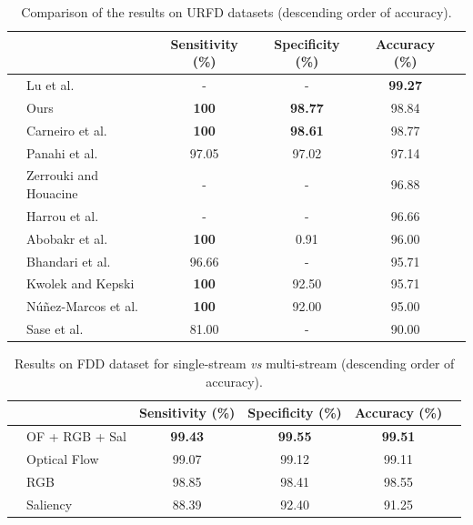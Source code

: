 \documentclass[conference]{IEEEtran}
\begin{document}
\begin{table}[]
\centering
\caption{Comparison of the results on URFD datasets (descending order of accuracy).}
\label{tab:urfd-our-their}
\begin{tabular}{llcccl}
\hline
 &                                                      & Sensitivity (\%)  & Specificity (\%)  & Accuracy (\%)     & \\ \hline
 & Lu et al.~\cite{lu2018deep}                          & -                 & -                 & \textbf{99.27}    & \\
 & Ours                                                 & \textbf{100}      & \textbf{98.77}    & 98.84             & \\
 & Carneiro et al.~\cite{carneiro2019multi}                                                 & \textbf{100}      & \textbf{98.61}    & 98.77             & \\
 & Panahi et al.~\cite{panahi2018human}                 & 97.05             & 97.02             & 97.14             & \\
 & Zerrouki and Houacine~\cite{zerrouki2018combined}    & -                 & -                 & 96.88             & \\
 & Harrou et al.~\cite{harrou2017vision}                & -                 & -                 & 96.66             & \\
 & Abobakr et al.~\cite{abobakr2017skeleton}            & \textbf{100}      & 0.91              & 96.00             & \\
 & Bhandari et al.~\cite{bhandari2017novel}             & 96.66             & -                 & 95.71             & \\
 & Kwolek and Kepski~\cite{kwolek2015improving}         & \textbf{100}      & 92.50             & 95.71             & \\
 & N\'u\~nez-Marcos et al.~\cite{nunez2017vision}       & \textbf{100}      & 92.00             & 95.00             & \\
 & Sase et al.~\cite{sase2018human}                     & 81.00             & -                 & 90.00             & \\ \hline
\end{tabular}
\end{table}
\begin{table}[]
\centering
\caption{Results on FDD dataset for single-stream \textit{vs} multi-stream (descending order of accuracy).}
\label{tab:fdd-ensem}
\begin{tabular}{llcccl}
\hline
 &  & Sensitivity (\%) & Specificity (\%) & Accuracy (\%) &  \\ \hline
 & OF + RGB + Sal & \textbf{99.43} & \textbf{99.55} & \textbf{99.51} &  \\
 & Optical Flow & 99.07             & 99.12             & 99.11             &  \\
 & RGB & 98.85             & 98.41             & 98.55             &  \\
 & Saliency & 88.39             & 92.40             & 91.25             & \\ \hline
\end{tabular}
\end{table}
\end{document}
